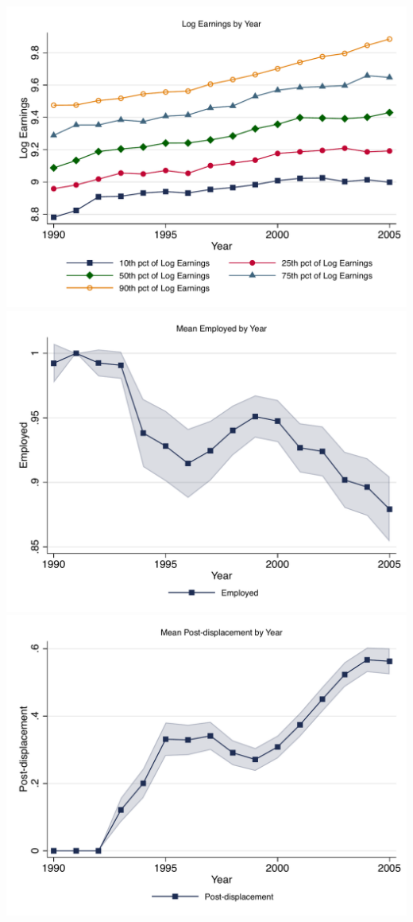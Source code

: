 \documentclass{article}
\begin{document}
\includegraphics[width = .9\textwidth]{Consistency/logearn_by_year_pct.pdf} \\ 
\includegraphics[width = .9\textwidth]{Consistency/employed_by_time.pdf} \\ 
\includegraphics[width = .9\textwidth]{Consistency/displaced_by_time.pdf} \\ 
\end{document}
